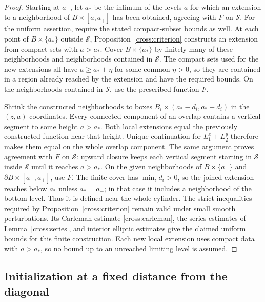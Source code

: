 \documentclass[11pt,a4paper]{article}
\theoremstyle{definition}
\theoremstyle{remark}
\numberwithin{equation}{section}
\begin{document}
\begin{proof}
Starting at $a_+$, let $a_*$ be the infimum of the levels $a$
for which an extension to a neighborhood of $B\times[a,a_+]$
has been obtained, agreeing with $F$ on $\mathcal S$. For the
uniform assertion, require the stated compact-subset bounds as well.
At each point of $B\times\{a_*\}$ outside $\mathcal S$,
Proposition~\ref{cross:criterion} constructs an extension from compact
sets with $a>a_*$. Cover $B\times\{a_*\}$ by finitely many of
these neighborhoods and neighborhoods contained in $\mathcal S$.
The compact sets used for the new extensions all have
$a\ge a_*+\eta$ for some common $\eta>0$, so they are contained
in a region already reached by the extension and have the required
bounds. On the neighborhoods contained in $\mathcal S$, use the
prescribed function $F$.

Shrink the constructed neighborhoods to boxes
$B_i\times(a_*-d_i,a_*+d_i)$ in the $(z,a)$ coordinates.
Every connected component of an overlap contains a vertical segment
to some height $a>a_*$. Both local extensions equal the previously
constructed function near that height. Unique continuation for
$L_1^x+L_2^y$ therefore makes them equal on the whole overlap
component. The same argument proves agreement with $F$ on
$\mathcal S$: upward closure keeps each vertical segment starting
in $\mathcal S$ inside $\mathcal S$ until it reaches $a>a_*$.
On the given neighborhoods of
$B\times\{a_+\}$ and $\partial B\times[a_-,a_+]$, use $F$.
The finite cover has $\min_i d_i>0$, so the joined extension reaches
below $a_*$ unless $a_*=a_-$; in that case it includes a neighborhood
of the bottom level. Thus it is defined near the whole cylinder.
The strict inequalities required by Proposition~\ref{cross:criterion}
remain valid under small smooth perturbations. Its Carleman estimate
\eqref{cross:carleman}, the series estimates of
Lemma~\ref{cross:series}, and interior elliptic estimates give the
claimed uniform bounds for this finite construction. Each new local
extension uses compact data with $a>a_*$, so no bound up to an
unreached limiting level is assumed.
\end{proof}

\subsection{Initialization at a fixed distance from the diagonal}
\end{document}
